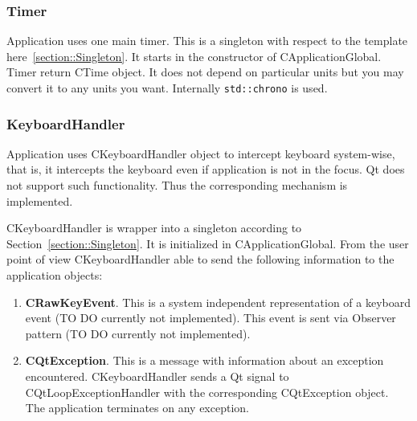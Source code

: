 \documentclass{article}
\begin{document}
\subsubsection{Timer}

Application uses one main timer. This is a singleton with respect to the template here~\ref{section::Singleton}. It starts in the constructor of CApplicationGlobal. Timer return CTime object. It does not depend on particular units but you may convert it to any units you want. Internally \verb"std::chrono" is used.






\subsubsection{KeyboardHandler}\label{section::KeyboardHandler}

Application uses CKeyboardHandler object to intercept keyboard system-wise, that is, it intercepts the keyboard even if application is not in the focus. Qt does not support such functionality. Thus the corresponding mechanism is implemented.

CKeyboardHandler is wrapper into a singleton according to Section~\ref{section::Singleton}. It is initialized in CApplicationGlobal. From the user point of view CKeyboardHandler able to send the following information to the application objects:
\begin{enumerate}
\item \textbf{CRawKeyEvent}. This is a system independent representation of a keyboard event (TO DO currently not implemented). This event is sent via Observer pattern (TO DO currently not implemented).

\item \textbf{CQtException}. This is a message with information about an exception encountered. CKeyboardHandler sends a Qt signal to CQtLoopExceptionHandler with the corresponding CQtException object. The application terminates on any exception.
\end{enumerate}
\end{document}
